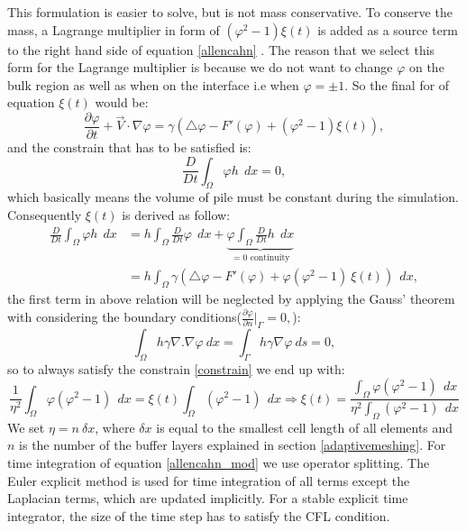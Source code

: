 \documentclass[review]{elsarticle}
\begin{document}
This formulation is easier to solve, but is not mass conservative. To conserve the mass, a Lagrange multiplier in form of $(\varphi^2-1)\xi(t)$ is added as a source term to the right hand side of equation \eqref{allencahn} \cite{Kim2014,Yang2006}. The reason that we select this form for the Lagrange multiplier is because we do not want to change $\varphi$ on the bulk region as well as when on the interface i.e when $\varphi=\pm1$. So the final for of equation $\xi(t)$ would be:  
\begin{equation} 
        \label{allencahn_mod}
        \frac{\partial \varphi }{\partial t} + \overrightarrow{V}\cdot \nabla \varphi = 
        \gamma (\bigtriangleup\varphi -F'(\varphi)+ (\varphi^2-1)\xi(t)),
\end{equation}
and the constrain that has to be satisfied is:
\begin{equation} 
        \label{constrain}
        \frac{D}{Dt} \int_\Omega \varphi h \ \ dx= 0,
\end{equation}
which basically means the volume of pile must be constant during the simulation. Consequently $\xi(t)$ is derived as follow:
\begin{equation} 
    \begin{aligned}
        \label{eta}
        \frac{D}{Dt} \int_\Omega \varphi h \ \ dx &= h \int_\Omega \frac{D}{Dt}  \varphi  \ \ dx+\underbrace{\varphi \int_\Omega  \frac{D}{Dt} h  \ \ dx}_{=0 \text{\ \ continuity}} \\ &=h\int_\Omega \gamma (\bigtriangleup\varphi -F'(\varphi)+\varphi (\varphi^2-1)\ \xi(t)) \ \ dx,
            \end{aligned}
\end{equation}
the first term in above relation will be neglected by applying the Gauss' theorem with considering the boundary conditions($
        \frac{\partial \varphi}{\partial n}\vert_{\Gamma} = 0,
$):
\begin{equation}
        \label{lapbound}
        \int_\Omega h \gamma  \nabla. \nabla \varphi \ dx = 
        \int_\Gamma h \gamma \nabla \varphi \ ds = 0,
\end{equation}
so to always satisfy the constrain \eqref{constrain} we end up with:
\begin{equation} 
        \label{eta_cont}
\frac{1}{\eta^2} \int_\Omega  \varphi (\varphi^2 -1) \ \ dx = \xi(t) \int_\Omega (\varphi^2-1)  \ \ dx \Rightarrow \xi(t) = \frac{\int_\Omega  \varphi (\varphi^2 -1) \ \ dx}{\eta^2 \int_\Omega (\varphi^2-1)  \ \ dx }
\end{equation}
We set $\eta=n\  \delta x$, where $\delta x$ is equal to the smallest cell length of all elements and $n$ is the number of the buffer layers explained in section \ref{adaptivemeshing}.
For time integration of equation \eqref{allencahn_mod} we use operator splitting. The Euler explicit method is used for time integration of all terms except the Laplacian terms, 
which are updated implicitly. For a stable explicit time integrator, the size of the time step has to satisfy the CFL condition.
\end{document}
